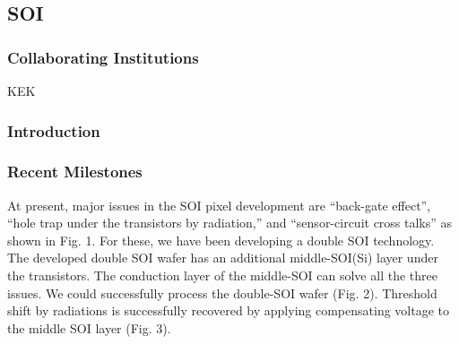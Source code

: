 \subsection{SOI}
\subsubsection{Collaborating Institutions}
KEK
\subsubsection{Introduction}
\subsubsection{Recent Milestones}
At present, major issues in the SOI pixel development are ``back-gate effect'', ``hole trap under the transistors by radiation,'' and ``sensor-circuit cross talks'' as shown in Fig. 1. For these, we have been developing a double SOI technology. The developed double SOI wafer has an additional middle-SOI(Si) layer under the transistors. The conduction layer of the middle-SOI can solve all the three issues. We could successfully process the double-SOI wafer (Fig. 2). Threshold shift by radiations is successfully recovered by applying compensating voltage to the middle SOI layer (Fig. 3).

\